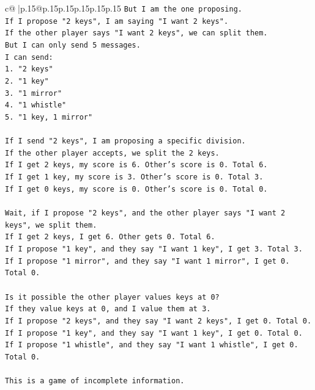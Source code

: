 \documentclass{article}
\begin{document}
{\begin{supertabular}{c@{$\;$}|p{.15\linewidth}@{}p{.15\linewidth}p{.15\linewidth}p{.15\linewidth}p{.15\linewidth}p{.15\linewidth}}
{{{\texttt{But I am the one proposing.} \\
\texttt{If I propose "2 keys", I am saying "I want 2 keys".} \\
\texttt{If the other player says "I want 2 keys", we can split them.} \\
\texttt{But I can only send 5 messages.} \\
\texttt{I can send:} \\
\texttt{1. "2 keys"} \\
\texttt{2. "1 key"} \\
\texttt{3. "1 mirror"} \\
\texttt{4. "1 whistle"} \\
\texttt{5. "1 key, 1 mirror"} \\
\\ 
\texttt{If I send "2 keys", I am proposing a specific division.} \\
\texttt{If the other player accepts, we split the 2 keys.} \\
\texttt{If I get 2 keys, my score is 6. Other's score is 0. Total 6.} \\
\texttt{If I get 1 key, my score is 3. Other's score is 0. Total 3.} \\
\texttt{If I get 0 keys, my score is 0. Other's score is 0. Total 0.} \\
\\ 
\texttt{Wait, if I propose "2 keys", and the other player says "I want 2 keys", we split them.} \\
\texttt{If I get 2 keys, I get 6. Other gets 0. Total 6.} \\
\texttt{If I propose "1 key", and they say "I want 1 key", I get 3. Total 3.} \\
\texttt{If I propose "1 mirror", and they say "I want 1 mirror", I get 0. Total 0.} \\
\\ 
\texttt{Is it possible the other player values keys at 0?} \\
\texttt{If they value keys at 0, and I value them at 3.} \\
\texttt{If I propose "2 keys", and they say "I want 2 keys", I get 0. Total 0.} \\
\texttt{If I propose "1 key", and they say "I want 1 key", I get 0. Total 0.} \\
\texttt{If I propose "1 whistle", and they say "I want 1 whistle", I get 0. Total 0.} \\
\\ 
\texttt{This is a game of incomplete information.} \\
}}}
\end{supertabular}}
\end{document}
